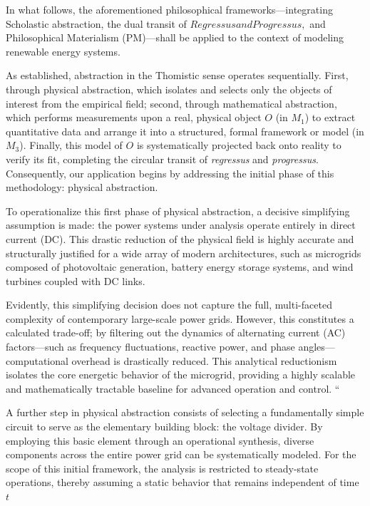 \documentclass[11pt, a4paper]{article}
\begin{document}
In what follows, the aforementioned philosophical frameworks—integrating Scholastic abstraction, the dual transit of \(\textit{Regressus} and \textit{Progressus},\) and Philosophical Materialism (PM)—shall be applied to the context of modeling renewable energy systems.

As established, abstraction in the Thomistic sense operates sequentially. First, through physical abstraction, which isolates and selects only the objects of interest from the empirical field; second, through mathematical abstraction, which performs measurements upon a real, physical object $O$ (in $M_1$) to extract quantitative data and arrange it into a structured, formal framework or model (in $M_3$). Finally, this model of $O$ is systematically projected back onto reality to verify its fit, completing the circular transit of \textit{regressus} and \textit{progressus}. Consequently, our application begins by addressing the initial phase of this methodology: physical abstraction.


To operationalize this first phase of physical abstraction, a decisive simplifying assumption is made: the power systems under analysis operate entirely in direct current (DC). This drastic reduction of the physical field is highly accurate and structurally justified for a wide array of modern architectures, such as microgrids composed of photovoltaic generation, battery energy storage systems, and wind turbines coupled with DC links.

Evidently, this simplifying decision does not capture the full, multi-faceted complexity of contemporary large-scale power grids. However, this constitutes a calculated trade-off; by filtering out the dynamics of alternating current (AC) factors—such as frequency fluctuations, reactive power, and phase angles—computational overhead is drastically reduced. This analytical reductionism isolates the core energetic behavior of the microgrid, providing a highly scalable and mathematically tractable baseline for advanced operation and control. ``

A further step in physical abstraction consists of selecting a fundamentally simple circuit to serve as the elementary building block: the voltage divider. By employing this basic element through an operational synthesis, diverse components across the entire power grid can be systematically modeled. For the scope of this initial framework, the analysis is restricted to steady-state operations, thereby assuming a static behavior that remains independent of time \(t\)
\end{document}
